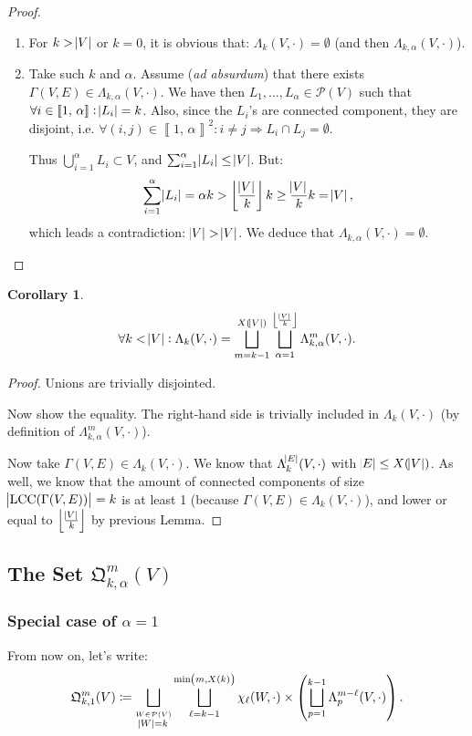 \documentclass{article}
\newtheorem{corollary}[lemma]{Corollary}
\theoremstyle{definition}
\theoremstyle{remark}
\DeclareMathOperator{\LCC}{LCC}
\newcommand{\intint}[2]{\left\llbracket#1, \, #2\right\rrbracket}
\newcommand{\floor}[1]{\left\lfloor#1\right\rfloor}
\begin{document}
		\begin{proof}~
		\begin{enumerate}
			\item For $k > \abs V$ or $k=0$, it is obvious that: $\Lambda_k(V, \cdot) = \emptyset$ (and then $\Lambda_{k,\alpha}(V, \cdot)$).
			\item Take such $k$ and $\alpha$. Assume (\textit{ad absurdum}) that there exists $\Gamma(V, E) \in \Lambda_{k, \alpha}(V, \cdot)$. We have then
			$L_1, \ldots, L_\alpha \in \mathcal P(V)$ such that $\forall i \in \intint 1\alpha : \abs {L_i} = k$. Also, since the $L_i$'s are connected component,
			they are disjoint, i.e. $\forall (i, j) \in \intint 1\alpha^2 : i \neq j \Rightarrow L_i \cap L_j = \emptyset$.

			Thus $\bigcup_{i=1}^\alpha L_i \subset V$, and $\sum_{i=1}^\alpha \abs {L_i} \leq \abs V$. But:
			\[\sum_{i=1}^\alpha\abs {L_i} = \alpha k > \floor {\frac {\abs V}k}k \geq \frac {\abs V}kk = \abs V,\]
			which leads a contradiction: $\abs V > \abs V$.
			We deduce that $\Lambda_{k,\alpha}(V, \cdot) = \emptyset$.
		\end{enumerate}
		\end{proof}

		\begin{corollary}
		\[\forall k < \abs V : \Lambda_k(V, \cdot) = \bigsqcup_{m=k-1}^{X(\abs V)}\bigsqcup_{\alpha=1}^{\floor {\frac {\abs V}k}}\Lambda_{k,\alpha}^m(V, \cdot).\]
		\end{corollary}

		\begin{proof} Unions are trivially disjointed.

		Now show the equality. The right-hand side is trivially included in $\Lambda_k(V, \cdot)$ (by definition of $\Lambda_{k,\alpha}^m(V, \cdot)$).

		Now take $\Gamma(V, E) \in \Lambda_k(V, \cdot)$. We know that $\Lambda_k^{\abs E}(V, \cdot)$ with $\abs E \leq X(\abs V)$. As well, we know that the amount
		of connected components of size $\abs {\LCC(\Gamma(V, E))} = k$ is at least 1 (because $\Gamma(V, E) \in \Lambda_k(V, \cdot)$), and lower or equal to
		$\floor {\frac {\abs V}k}$ by previous Lemma.
		\end{proof}


	\subsection{The Set $\mathfrak Q_{k,\alpha}^m(V)$}
		\subsubsection{Special case of $\alpha=1$}
			From now on, let's write:
			\[\mathfrak Q_{k,1}^m(V) \coloneqq \bigsqcup_{\stackrel {W \in \mathcal P(V)}{\abs W = k}}\bigsqcup_{\ell=k-1}^{\min\left(m, X(k)\right)}
				\chi_\ell(W, \cdot) \times \left(\bigsqcup_{p=1}^{k-1}\Lambda_p^{m-\ell}(V, \cdot)\right).\]
\end{document}
